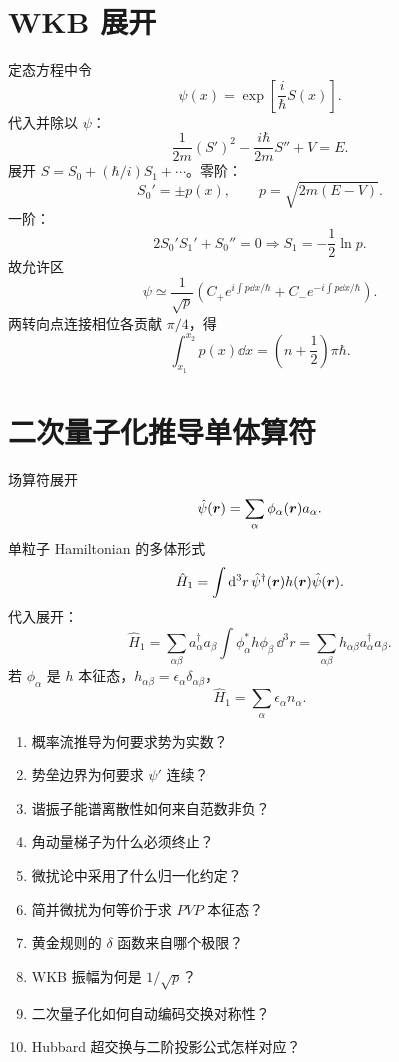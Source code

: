 \section{WKB 展开}
定态方程中令
\[
\psi(x)=\exp\left[\frac{i}{\hbar}S(x)\right].
\]
代入并除以 $\psi$：
\[
\frac{1}{2m}(S')^2-\frac{i\hbar}{2m}S''+V=E.
\]
展开 $S=S_0+(\hbar/i)S_1+\cdots$。零阶：
\[
S_0'=\pm p(x),\qquad p=\sqrt{2m(E-V)}.
\]
一阶：
\[
2S_0'S_1'+S_0''=0
\Rightarrow S_1=-\frac12\ln p.
\]
故允许区
\[
\psi\simeq\frac1{\sqrt p}
\left(C_+e^{i\int p\dd x/\hbar}
+C_-e^{-i\int p\dd x/\hbar}\right).
\]
两转向点连接相位各贡献 $\pi/4$，得
\[
\int_{x_1}^{x_2}p(x)\dd x
=\left(n+\frac12\right)\pi\hbar.
\]

\section{二次量子化推导单体算符}
场算符展开
\[
\hat\psi(\bm{r})=\sum_\alpha\phi_\alpha(\bm{r})a_\alpha.
\]
单粒子 Hamiltonian 的多体形式
\[
\hat H_1=\int\mathrm d^3r\,
\hat\psi^\dagger(\bm{r})h(\bm{r})\hat\psi(\bm{r}).
\]
代入展开：
\[
\hat H_1=\sum_{\alpha\beta}
a_\alpha^\dagger a_\beta
\int\phi_\alpha^*h\phi_\beta\,\dd^3r
=\sum_{\alpha\beta}h_{\alpha\beta}
a_\alpha^\dagger a_\beta.
\]
若 $\phi_\alpha$ 是 $h$ 本征态，$h_{\alpha\beta}=\epsilon_\alpha\delta_{\alpha\beta}$，
\[
\hat H_1=\sum_\alpha\epsilon_\alpha n_\alpha.
\]

\begin{selftestbox}
\begin{enumerate}
\item 概率流推导为何要求势为实数？
\item 势垒边界为何要求 $\psi'$ 连续？
\item 谐振子能谱离散性如何来自范数非负？
\item 角动量梯子为什么必须终止？
\item 微扰论中采用了什么归一化约定？
\item 简并微扰为何等价于求 $PVP$ 本征态？
\item 黄金规则的 $\delta$ 函数来自哪个极限？
\item WKB 振幅为何是 $1/\sqrt p$？
\item 二次量子化如何自动编码交换对称性？
\item Hubbard 超交换与二阶投影公式怎样对应？
\end{enumerate}
\end{selftestbox}
